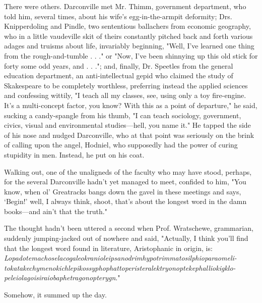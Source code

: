   There were others. Darconville met Mr. Thimm, government department, who told
him, several times, about his wife's egg-in-the-armpit deformity; Drs.
Knipperdoling and Pindle, two sententious ballachers from economic geography,
who in a little vaudeville skit of theirs constantly pitched back and forth
various adages and truisms about life, invariably beginning, "Well, I've learned
one thing from the rough-and-tumble . . ." or "Now, I've been shinnying up this
old stick for forty some odd years, and . . ."; and, finally, Dr. Speetles from
the general education department, an anti-intellectual gepid who claimed the
study of Skakespeare to be completely worthless, preferring instead the applied
sciences and confessing wittily, "I teach all my classes, see, using only a toy
fire-engine. It's a multi-concept factor, you know? With this as a point of
departure," he said, sucking a candy-spangle from his thumb, "I can teach
sociology, government, civics, visual and environmental studies---hell, you name
it." He tapped the side of his nose and nudged Darconville, who at that point
was seriously on the brink of calling upon the angel, Hodniel, who supposedly
had the power of curing stupidity in men. Instead, he put on his coat.

  Walking out, one of the unaligneds of the faculty who may have stood, perhaps,
for the several Darconville hadn't yet managed to meet, confided to him, "You
know, when ol' Greatracks bangs down the gavel in these meetings and says,
`Begin!' well, I always think, shoot, that's about the longest word in the damn
books---and ain't that the truth."

  The thought hadn't been uttered a second when Prof. Wratschewe, grammarian,
suddenly jumping-jacked out of nowhere and said, "Actually, I think you'll find
that the longest word found in literature, Aristophanic in origin, is:
\textit{
Lopadotemachoselacogaleokranioleipsanodrimhypotrimmatosilphioparaomeli-\\
tokatakechymenokichlepikossyphophattoperisteralektryonoptekephalliokigklo-\\
peleiolagoisiraiobaphetragonopterygn}."

  Somehow, it summed up the day.
 
